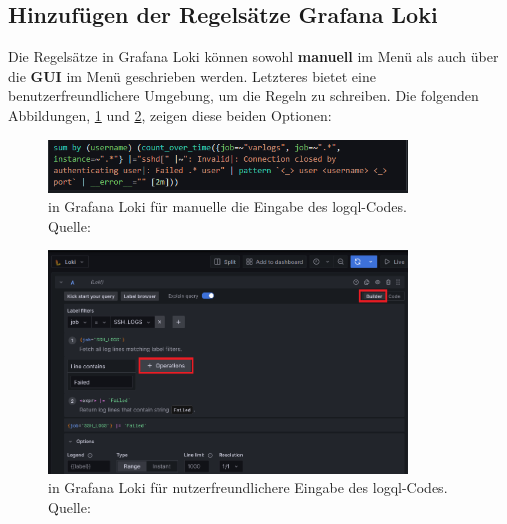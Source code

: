  

\subsection{Hinzufügen der Regelsätze Grafana Loki}
Die Regelsätze in Grafana Loki können sowohl \textbf{manuell} im Menü  als auch über die \textbf{\gls{GUI}} im Menü  geschrieben werden. Letzteres bietet eine benutzerfreundlichere Umgebung, um die Regeln zu schreiben. Die folgenden Abbildungen, \ref{fig:Loki_Code} und \ref{fig:Loki_Builder}, zeigen diese beiden Optionen:

\begin{figure}[H]
   \centering
   \includegraphics[width=0.85\textwidth]{assets/manuellerCodeLoki.png}
   \caption[ in Grafana Loki für manuelle die Eingabe des \gls{logql}-Codes]
   { in Grafana Loki für manuelle die Eingabe des \gls{logql}-Codes. \\ Quelle: \citep{VoidQuark_sshlogs}}
   \label{fig:Loki_Code}
   \centering
\end{figure}

\begin{figure}[H]
   \centering
   \includegraphics[width=0.85\textwidth]{assets/klickibuntyGrafana.png}
   \caption[ in Grafana Loki für nutzerfreundlichere Eingabe des \gls{logql}-Codes.]
   { in Grafana Loki für nutzerfreundlichere Eingabe des \gls{logql}-Codes. Quelle: \citep{VoidQuark_sshlogs}}
   \label{fig:Loki_Builder}
   \centering
\end{figure}

